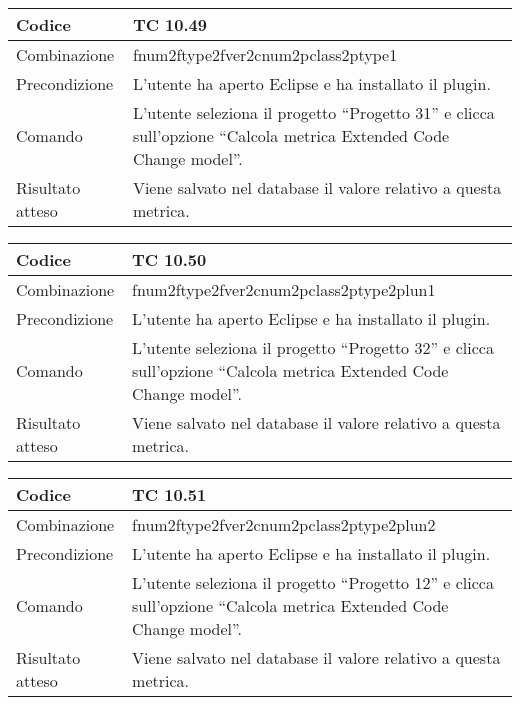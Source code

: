 \begin{table}[ht]
\begin{tabular}{|p{3cm}|p{9cm}|}
\hline
\cellcolor{lightgray}Codice				& TC 10.49								\\
\hline
\cellcolor{lightgray}Combinazione		& fnum2ftype2fver2cnum2pclass2ptype1									\\
\hline
\cellcolor{lightgray}Precondizione		& L'utente ha aperto Eclipse e ha installato il plugin.		\\
\hline
\cellcolor{lightgray}Comando			& L'utente seleziona il progetto ``Progetto 31''  e clicca sull'opzione ``Calcola metrica Extended Code Change model''.	\\
\hline
\cellcolor{lightgray}Risultato atteso	& Viene salvato nel database il valore relativo a questa metrica.\\
\hline
\end{tabular}
\end{table}

\begin{table}[ht]
\begin{tabular}{|p{3cm}|p{9cm}|}
\hline
\cellcolor{lightgray}Codice				& TC 10.50								\\
\hline
\cellcolor{lightgray}Combinazione		& fnum2ftype2fver2cnum2pclass2ptype2plun1									\\
\hline
\cellcolor{lightgray}Precondizione		& L'utente ha aperto Eclipse e ha installato il plugin.		\\
\hline
\cellcolor{lightgray}Comando			& L'utente seleziona il progetto ``Progetto 32''  e clicca sull'opzione ``Calcola metrica Extended Code Change model''.	\\
\hline
\cellcolor{lightgray}Risultato atteso	& Viene salvato nel database il valore relativo a questa metrica.\\
\hline
\end{tabular}
\end{table}

\begin{table}[ht]
\begin{tabular}{|p{3cm}|p{9cm}|}
\hline
\cellcolor{lightgray}Codice				& TC 10.51								\\
\hline
\cellcolor{lightgray}Combinazione		& fnum2ftype2fver2cnum2pclass2ptype2plun2									\\
\hline
\cellcolor{lightgray}Precondizione		& L'utente ha aperto Eclipse e ha installato il plugin.		\\
\hline
\cellcolor{lightgray}Comando			& L'utente seleziona il progetto ``Progetto 12''  e clicca sull'opzione ``Calcola metrica Extended Code Change model''.	\\
\hline
\cellcolor{lightgray}Risultato atteso	& Viene salvato nel database il valore relativo a questa metrica.\\
\hline
\end{tabular}
\end{table}

